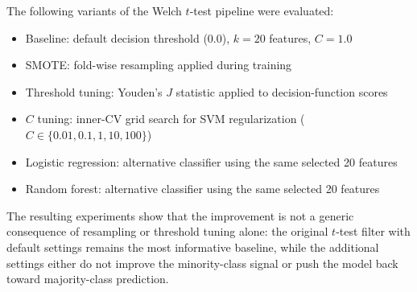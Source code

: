 The following variants of the Welch $t$-test pipeline were evaluated:
\begin{itemize}
    \item Baseline: default decision threshold (0.0), $k = 20$ features, $C = 1.0$
    \item SMOTE: fold-wise resampling applied during training
    \item Threshold tuning: Youden's $J$ statistic applied to decision-function scores
    \item $C$ tuning: inner-CV grid search for SVM regularization ($C \in \{0.01, 0.1, 1, 10, 100\}$)
    \item Logistic regression: alternative classifier using the same selected 20 features
    \item Random forest: alternative classifier using the same selected 20 features
\end{itemize}

The resulting experiments show that the improvement is not a generic consequence of resampling or threshold tuning alone: the original $t$-test filter with default settings remains the most informative baseline, while the additional settings either do not improve the minority-class signal or push the model back toward majority-class prediction.

